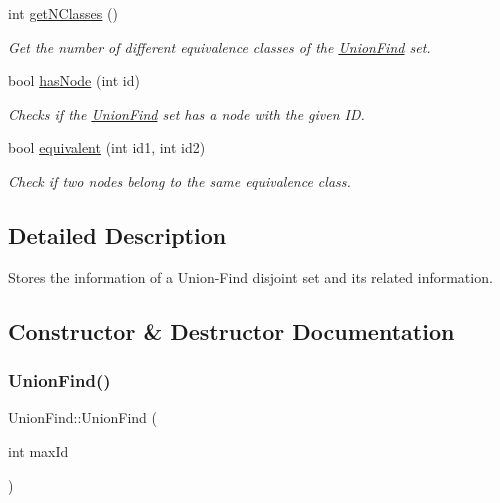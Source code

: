 \begin{DoxyCompactItemize}
int \hyperlink{classUnionFind_a47b6b7874590396185e6cf17bfec37c8}{get\+N\+Classes} ()
\begin{DoxyCompactList}\small\item\em Get the number of different equivalence classes of the \hyperlink{classUnionFind}{Union\+Find} set. \end{DoxyCompactList}\item 
bool \hyperlink{classUnionFind_a621d2ffe71e3b584b81c2da377da0f87}{has\+Node} (int id)
\begin{DoxyCompactList}\small\item\em Checks if the \hyperlink{classUnionFind}{Union\+Find} set has a node with the given ID. \end{DoxyCompactList}\item 
bool \hyperlink{classUnionFind_a1f5ed5a7c490e938d3f9a9abb6642e20}{equivalent} (int id1, int id2)
\begin{DoxyCompactList}\small\item\em Check if two nodes belong to the same equivalence class. \end{DoxyCompactList}\end{DoxyCompactItemize}


\subsection{Detailed Description}
Stores the information of a Union-\/\+Find disjoint set and its related information. 

\subsection{Constructor \& Destructor Documentation}
\mbox{\label{classUnionFind_ad36f529ec0f1e7414e164bf1071bc87c}} 
\subsubsection{\texorpdfstring{Union\+Find()}{UnionFind()}}
{\footnotesize\ttfamily Union\+Find\+::\+Union\+Find (\begin{DoxyParamCaption}\item[{int}]{max\+Id }\end{DoxyParamCaption})\hspace{0.3cm}{\ttfamily [explicit]}}



